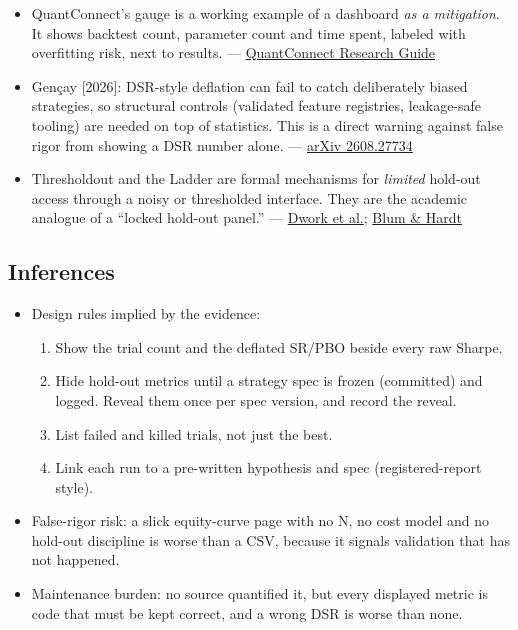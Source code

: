 \documentclass{article}
\begin{document}
\begin{itemize}
\item QuantConnect's gauge is a working example of a dashboard \emph{as a mitigation}. It shows backtest count, parameter count and time spent, labeled with overfitting risk, next to results. --- \href{https://www.quantconnect.com/docs/v2/cloud-platform/backtesting/research-guide}{QuantConnect Research Guide}

\item Gençay [2026]: DSR-style deflation can fail to catch deliberately biased strategies, so structural controls (validated feature registries, leakage-safe tooling) are needed on top of statistics. This is a direct warning against false rigor from showing a DSR number alone. --- \href{https://arxiv.org/abs/2608.27734}{arXiv 2608.27734}

\item Thresholdout and the Ladder are formal mechanisms for \emph{limited} hold-out access through a noisy or thresholded interface. They are the academic analogue of a ``locked hold-out panel.'' --- \href{https://www.science.org/doi/10.1126/science.aaa9375}{Dwork et al.}; \href{https://proceedings.mlr.press/v37/blum15.pdf}{Blum \& Hardt}

\end{itemize}

\subsection{Inferences}

\begin{itemize}

\item Design rules implied by the evidence:

\begin{enumerate}

\item Show the trial count and the deflated SR/\allowbreak{}PBO beside every raw Sharpe.

\item Hide hold-out metrics until a strategy spec is frozen (committed) and logged. Reveal them once per spec version, and record the reveal.

\item List failed and killed trials, not just the best.

\item Link each run to a pre-written hypothesis and spec (registered-report style).

\end{enumerate}

\item False-rigor risk: a slick equity-curve page with no N, no cost model and no hold-out discipline is worse than a CSV, because it signals validation that has not happened.

\item Maintenance burden: no source quantified it, but every displayed metric is code that must be kept correct, and a wrong DSR is worse than none.

\end{itemize}
\end{document}
